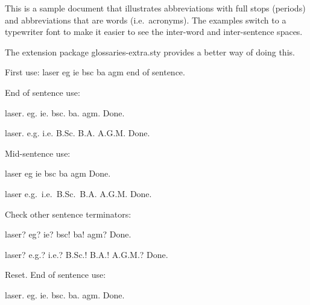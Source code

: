 \documentclass{article}
\begin{document}
This is a sample document that illustrates abbreviations with
full stops (periods) and abbreviations that are words (i.e.\
acronyms). The examples switch to a typewriter font to make it
easier to see the inter-word and inter-sentence spaces.

The extension package glossaries-extra.sty provides a better way of
doing this.

First use: \gls{laser} \gls{eg} \gls{ie} \gls{bsc} \gls{ba} \gls{agm} end of
sentence.

End of sentence use:

\ttfamily

\gls{laser}. \gls{eg}. \gls{ie}. \gls{bsc}. \gls{ba}. \gls{agm}.
Done.

laser. e.g. i.e. B.Sc. B.A\@. A.G.M\@. Done.

\rmfamily

Mid-sentence use:

\ttfamily

\gls{laser} \gls{eg} \gls{ie} \gls{bsc} \gls{ba} \gls{agm} Done.

laser e.g.\ i.e.\ B.Sc.\ B.A. A.G.M. Done.

\rmfamily

Check other sentence terminators:

\ttfamily

\gls{laser}? \gls{eg}? \gls{ie}? \gls{bsc}! \gls{ba}! \gls{agm}? Done.

laser? e.g.? i.e.? B.Sc.! B.A.! A.G.M.? Done.

\rmfamily

\glsresetall Reset. End of sentence use:

\ttfamily

\gls{laser}. \gls{eg}. \gls{ie}. \gls{bsc}. \gls{ba}. \gls{agm}.
Done.

\rmfamily
\printglossaries
\end{document}
